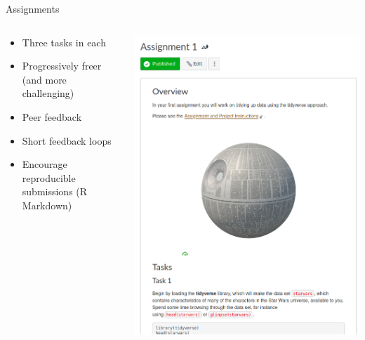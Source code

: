 \begin{frame}{Assignments}
  \begin{columns}[c,onlytextwidth]
    \begin{column}{0.5\linewidth}
      \begin{itemize}
        \item Three tasks in each
        \item Progressively freer (and more challenging)
        \item Peer feedback
        \item Short feedback loops
        \item Encourage reproducible submissions (R Markdown)
      \end{itemize}
    \end{column}
    \begin{column}{0.5\linewidth}
      \includegraphics[width=\linewidth]{figures/assignment.png}
    \end{column}
  \end{columns}
\end{frame}

